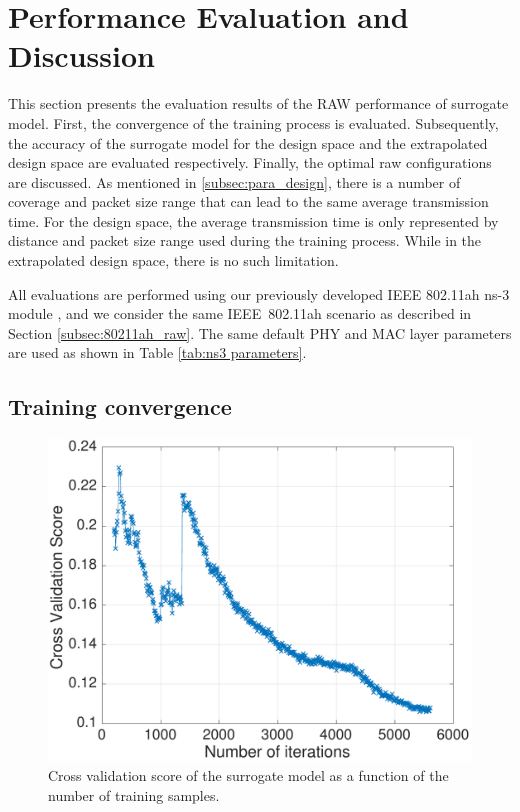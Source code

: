 \section{Performance Evaluation and Discussion \label{sec:evaluation}}

This section presents the evaluation results of the RAW performance of surrogate model. First, the  convergence of the training process is evaluated. Subsequently, the accuracy of the surrogate model for the design space and the extrapolated design space are evaluated respectively. Finally, the optimal \gls{raw} configurations are discussed. As mentioned in \ref{subsec:para_design}, there is a number of coverage and packet size range that can lead to the same average transmission time. For the design space, the average transmission time is only represented by distance and packet size range used during the training process. While in the extrapolated design space, there is no such limitation.

All evaluations are performed using our previously developed
IEEE 802.11ah ns-3 module \cite{WNS32016}, and we consider the same IEEE~802.11ah scenario as described in Section \ref{subsec:80211ah_raw}. The same default PHY and MAC layer parameters are used as shown in Table \ref{tab:ns3 parameters}.


\subsection{Training convergence}
\begin{figure}[t]
  \centering
  \includegraphics[width=0.75\columnwidth]{figures/throughput-cv}
  \caption{Cross validation score of the surrogate model as a function of the number of training samples. \label{fig:sumo-iteraton}}
\end{figure}

